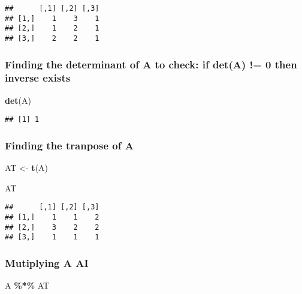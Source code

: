 \documentclass[
]{article}
\newenvironment{Shaded}{\begin{snugshade}}{\end{snugshade}}
\newcommand{\FunctionTok}[1]{\textcolor[rgb]{0.13,0.29,0.53}{\textbf{#1}}}
\newcommand{\NormalTok}[1]{#1}
\newcommand{\OtherTok}[1]{\textcolor[rgb]{0.56,0.35,0.01}{#1}}
\newcommand{\SpecialCharTok}[1]{\textcolor[rgb]{0.81,0.36,0.00}{\textbf{#1}}}
\begin{document}
\begin{verbatim}
##      [,1] [,2] [,3]
## [1,]    1    3    1
## [2,]    1    2    1
## [3,]    2    2    1
\end{verbatim}

\hypertarget{finding-the-determinant-of-a-to-check-if-deta-0-then-inverse-exists}{%
\subsubsection{Finding the determinant of A to check: if det(A) != 0
then inverse
exists}\label{finding-the-determinant-of-a-to-check-if-deta-0-then-inverse-exists}}

\begin{Shaded}
\begin{Highlighting}[]
\FunctionTok{det}\NormalTok{(A)}
\end{Highlighting}
\end{Shaded}

\begin{verbatim}
## [1] 1
\end{verbatim}

\hypertarget{finding-the-tranpose-of-a}{%
\subsubsection{Finding the tranpose of
A}\label{finding-the-tranpose-of-a}}

\begin{Shaded}
\begin{Highlighting}[]
\NormalTok{AT }\OtherTok{\textless{}{-}} \FunctionTok{t}\NormalTok{(A)}

\NormalTok{AT}
\end{Highlighting}
\end{Shaded}

\begin{verbatim}
##      [,1] [,2] [,3]
## [1,]    1    1    2
## [2,]    3    2    2
## [3,]    1    1    1
\end{verbatim}

\hypertarget{mutiplying-a-ai}{%
\subsubsection{Mutiplying A AI}\label{mutiplying-a-ai}}

\begin{Shaded}
\begin{Highlighting}[]
\NormalTok{A }\SpecialCharTok{\%*\%}\NormalTok{ AT}
\end{Highlighting}
\end{Shaded}
\end{document}
